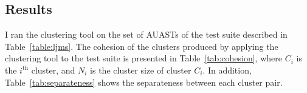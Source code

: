 






\subsection{Results}  \label{study3-results}


I ran the clustering tool on the set of AUASTs of the test suite described in Table~\ref{table:ljms}. The cohesion of the clusters produced by applying the clustering tool to the test suite is presented in Table~\ref{tab:cohesion}, where $C_i$ is the  $i^{\text{th}}$ cluster, and $N_i$ is the cluster size of cluster ${C_i}$. In addition, Table~\ref{tab:separateness} shows the separateness between each cluster pair. 



